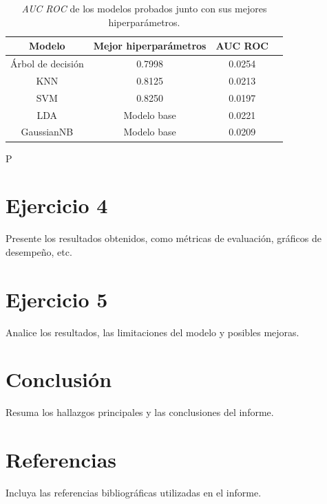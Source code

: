 \documentclass[10pt,a4paper]{article}
\begin{document}
 \begin{table}[H]
    \centering
    \begin{tabular}{|c|c|c|c|}
    \hline
    \textbf{Modelo}  & Mejor hiperparámetros & \textbf{AUC ROC} \\
    \hline
    Árbol de decisión & 0.7998 & 0.0254 \\
    \hline
    KNN & 0.8125 & 0.0213 \\
    \hline
    SVM & 0.8250 & 0.0197 \\
    \hline
    LDA & Modelo base & 0.0221 \\
    \hline
    GaussianNB & Modelo base & 0.0209 \\
    \hline
    \end{tabular}
    \caption{\textit{AUC ROC} de los modelos probados junto con sus mejores hiperparámetros.}
     
    \label{tab:resultados-modelos}
    
 \end{table}

 P

 \section{Ejercicio 4}
Presente los resultados obtenidos, como métricas de evaluación, gráficos de desempeño, etc.

\section{Ejercicio 5}
Analice los resultados, las limitaciones del modelo y posibles mejoras.

\section{Conclusión}
Resuma los hallazgos principales y las conclusiones del informe.

\section*{Referencias}
Incluya las referencias bibliográficas utilizadas en el informe.
\end{document}
